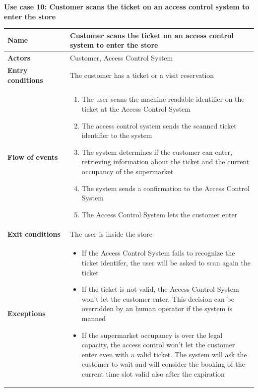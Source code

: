 \clearpage
\textbf{Use case 10: Customer scans the ticket on an access control system to enter the store}
\smallskip
{}
\begin{longtable}{p{0.25\linewidth}p{0.75\linewidth}}
    \toprule
    \textbf{Name}                               & \textbf{Customer scans the ticket on an access control system to enter the store} \\
    \midrule
    \textbf{Actors}                             & Customer, Access Control System                                                   \\
    \midrule
    \textbf{Entry conditions}                   & The customer has a ticket or a visit reservation                                  \\
    \midrule
    \textbf{Flow of events}                     &
    \begin{enumerate}
        \item The user scans the machine readable identifier on the ticket at the Access Control System
        \item The access control system sends the scanned ticket identifier to the system
        \item The system determines if the customer can enter, retrieving information about the ticket and the current occupancy of the supermarket
        \item The system sends a confirmation to the Access Control System
        \item The Access Control System lets the customer enter
    \end{enumerate}                                                                                                      \\
    \midrule
    \textbf{Exit conditions}                    & The user is inside the store                                                      \\
    \midrule
    \textbf{Exceptions}                         &
    \begin{itemize}
        \item If the Access Control System fails to recognize the ticket identifer, the user will be asked to scan again the ticket
        \item If the ticket is not valid, the Access Control System won't let the customer enter. This decision can be overridden by an human operator if the system is manned
        \item If the supermarket occupancy is over the legal capacity, the access control won't let the customer enter even with a valid ticket. The system will ask the customer to wait and will consider the booking of the current time slot valid also after the expiration

\end{itemize}
\end{longtable}
